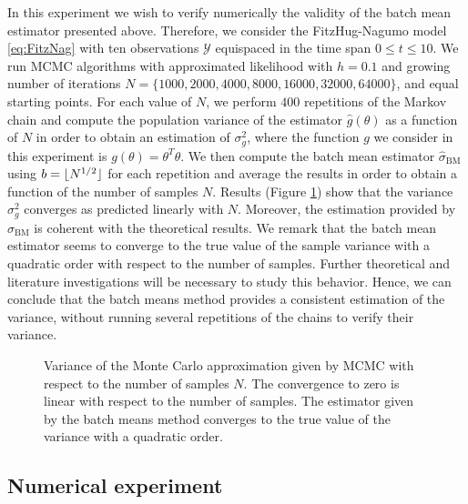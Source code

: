 In this experiment we wish to verify numerically the validity of the batch mean estimator presented above. Therefore, we consider the FitzHug-Nagumo model \eqref{eq:FitzNag} with ten observations $\mathcal{Y}$ equispaced in the time span $0 \leq t \leq 10$. We run MCMC algorithms with approximated likelihood with $h = 0.1$ and growing number of iterations $N = \{1000, 2000, 4000, 8000, 16000, 32000, 64000\}$, and equal starting points. For each value of $N$, we perform $400$ repetitions of the Markov chain and compute the population variance of the estimator $\hat g(\theta)$ as a function of $N$ in order to obtain an estimation of $\sigma^2_g$, where the function $g$ we consider in this experiment is $g(\theta) = \theta^T\theta$. We then compute the batch mean estimator $\hat \sigma_{\mathrm{BM}}$ using $b = \lfloor N^{1/2}\rfloor$ for each repetition and average the results in order to obtain a function of the number of samples $N$. Results (Figure \ref{fig:BatchMeans}) show that the variance $\sigma^2_g$ converges as predicted linearly with $N$. Moreover, the estimation provided by $\hat \sigma_{\mathrm{BM}}$ is coherent with the theoretical results. We remark that the batch mean estimator seems to converge to the true value of the sample variance with a quadratic order with respect to the number of samples. Further theoretical and literature investigations will be necessary to study this behavior. Hence, we can conclude that the batch means method provides a consistent estimation of the variance, without running several repetitions of the chains to verify their variance.

\begin{figure}[t]
	\centering
	\begin{subfigure}{0.49\linewidth}
		\centering
		\resizebox{1.0\linewidth}{!}{}
	\end{subfigure}
	\begin{subfigure}{0.49\linewidth}
		\centering
		\resizebox{1.0\linewidth}{!}{}
	\end{subfigure}
	\caption{Variance of the Monte Carlo approximation given by MCMC with respect to the number of samples $N$. The convergence to zero is linear with respect to the number of samples. The estimator given by the batch means method converges to the true value of the variance with a quadratic order.}
	\label{fig:BatchMeans}
\end{figure}

\subsection{Numerical experiment}

